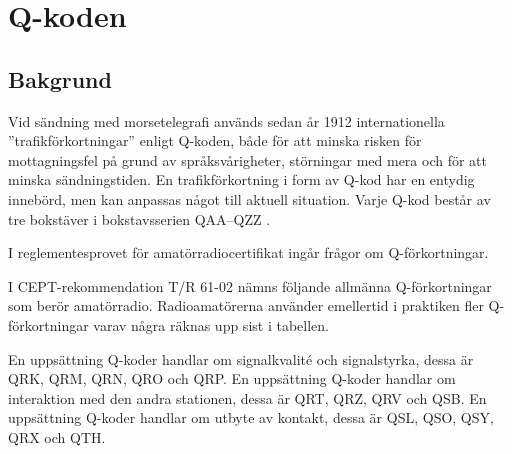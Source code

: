 \section{Q-koden}
\label{q-koden}

\subsection{Bakgrund}

Vid sändning med morsetelegrafi används sedan år 1912 internationella
''trafikförkortningar'' enligt Q-koden, både för att minska risken för
mottagningsfel på grund av språksvårigheter, störningar med mera och för
att minska sändningstiden.
En trafikförkortning i form av Q-kod har en entydig innebörd, men kan anpassas
något till aktuell situation.
Varje Q-kod består av tre bokstäver i bokstavsserien QAA--QZZ
\cite[M.1172]{ITU-RR}.

I reglementesprovet för amatörradiocertifikat ingår frågor om Q-förkortningar.

I CEPT-rekommendation T/R 61-02 \cite[Annex 6]{TR6102} nämns följande allmänna
Q-förkortningar som berör amatörradio.
Radioamatörerna använder emellertid i praktiken fler Q-förkortningar varav
några räknas upp sist i tabellen.

En uppsättning Q-koder handlar om signalkvalité och signalstyrka, dessa är
QRK, QRM, QRN, QRO och QRP.
En uppsättning Q-koder handlar om interaktion med den andra stationen,
dessa är QRT, QRZ, QRV och QSB.
En uppsättning Q-koder handlar om utbyte av kontakt, dessa är QSL, QSO,
QSY, QRX och QTH.

